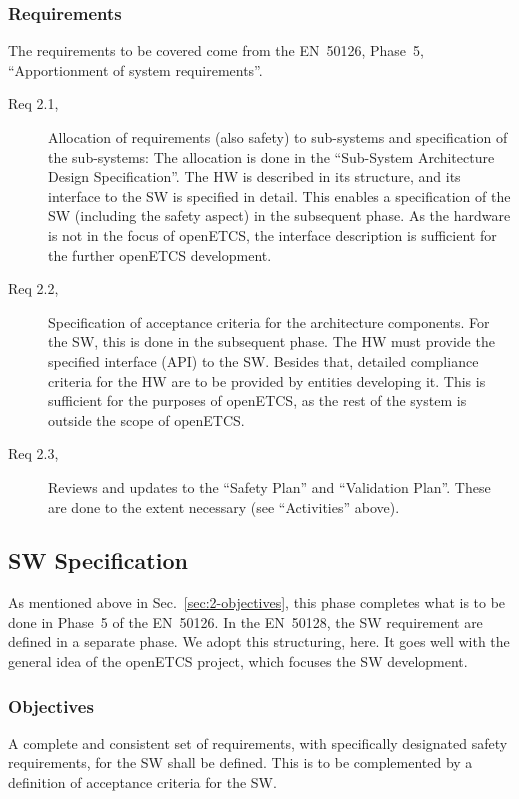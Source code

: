 \documentclass{template/openetcs_article}
\begin{document}
\subsubsection{Requirements}
\label{sec:2-requirements}

The requirements to be covered come from the EN~50126, Phase~5,
``Apportionment of system requirements''. 
\begin{description}
\item[Req 2.1, {\cite[6.5.3.1]{EN50126:1999}}] Allocation of
  requirements (also safety) to sub-systems and specification of the
  sub-systems: The allocation is done in the ``Sub-System Architecture
  Design Specification''. The HW is described in its structure, and
  its interface to the SW is specified in detail. This enables a
  specification of the SW (including the safety aspect) in the
  subsequent phase. As the hardware is not in the focus of openETCS,
  the interface description is sufficient for the further openETCS
  development.
\item[Req 2.2, {\cite[6.5.3.2]{EN50126:1999}}] Specification of
  acceptance criteria for the architecture components. For the SW,
  this is done in the subsequent phase. The HW must provide the
  specified interface (API) to the SW. Besides that, detailed
  compliance criteria for the HW are to be provided by entities
  developing it. This is sufficient for the purposes of openETCS, as
  the rest of the system is outside the scope of openETCS.
\item[Req 2.3, {\cite[6.5.3.3]{EN50126:1999}}] Reviews and updates to
  the ``Safety Plan'' and ``Validation Plan''. These are done to the
  extent necessary (see ``Activities'' above).
  \end{description}

\subsection{SW Specification}
\label{sec:software-requirements}

As mentioned above in Sec.~\ref{sec:2-objectives}, this phase
completes what is to be done in Phase~5 of the EN~50126. In the
EN~50128, the SW requirement are defined in a separate phase. We
adopt this structuring, here. It goes well with the general idea of
the openETCS project, which focuses the SW development.  

\subsubsection{Objectives}
\label{sec:3-objectives}
A complete and consistent set of requirements, with specifically
designated safety requirements, for the SW shall be defined. This is
to be complemented by a definition of acceptance criteria for the SW. 
\end{document}
